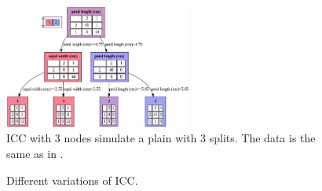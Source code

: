 \documentclass[11pt]{article}
\begin{document}
\begin{figure}[H]
\centering
\includegraphics[width=0.55\textwidth]{icc.png}

\caption{ICC with 3 nodes simulate a plain with 3 splits. The data is the same as in .}
\label{fig:fig2}

\end{figure}


\begin{figure}[H]
        	\centering
           \caption{Different variations of ICC.}
           \label{fig:fig3}
\end{figure}    
\end{document}
